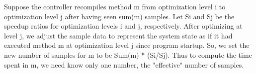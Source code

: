 Suppose the controller recompiles method m from optimization level i to optimization level j after having seen sum(m) samples. Let Si and Sj be the speedup ratios for optimization levels i and j, respectively. After optimizing at level j, we adjust the sample data to represent the system state as if it had executed method m at optimization level j since program startup. So, we set the new number of samples for m to be Sum(m) * (Si/Sj). Thus to compute the time spent in m, we need know only one number, the "effective" number of samples.